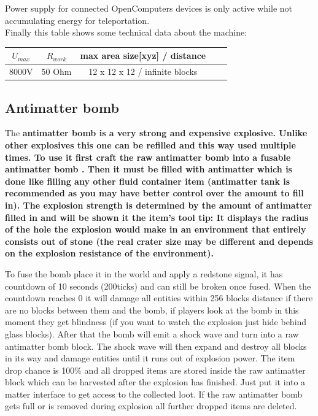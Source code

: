 \documentclass[11pt]{article} %
\begin{document}
Power supply for connected OpenComputers devices is only active while not accumulating energy for teleportation.\\

Finally this table shows some technical data about the machine: \\
\begin{tabular}{| c | c | c | c | c |} \hline
\bf $U_{max}$ & \bf $R_{work}$  & \bf max area size[xyz] / distance \\ \hline
8000V & 50 Ohm & 12 x 12 x 12 / infinite blocks \\ \hline
\end{tabular}

\subsection{Antimatter bomb}
The \bf antimatter bomb \rm is a very strong and expensive explosive. Unlike other explosives this one can be refilled and this way used multiple times. To use it first craft the \bf raw antimatter bomb \rm into a \bf fusable antimatter bomb \rm. Then it must be filled with antimatter which is done like filling any other fluid container item (antimatter tank is recommended as you may have better control over the amount to fill in). The explosion strength is determined by the amount of antimatter filled in and will be shown it the item's tool tip: It displays the radius of the hole the explosion would make in an environment that entirely consists out of stone (the real crater size may be different and depends on the explosion resistance of the environment). 

To fuse the bomb place it in the world and apply a redstone signal, it has countdown of 10 seconds (200ticks) and can still be broken once fused. When the countdown reaches 0 it will damage all entities within 256 blocks distance if there are no blocks between them and the bomb, if players look at the bomb in this moment they get blindness (if you want to watch the explosion just hide behind glass blocks). After that the bomb will emit a shock wave and turn into a raw antimatter bomb block. The shock wave will then expand and destroy all blocks in its way and damage entities until it runs out of explosion power. The item drop chance is 100\% and all dropped items are stored inside the raw antimatter block which can be harvested after the explosion has finished. Just put it into a matter interface to get access to the collected loot. If the raw antimatter bomb gets full or is removed during explosion all further dropped items are deleted.
\end{document}
